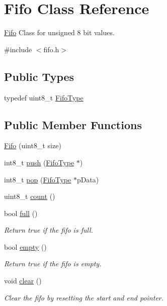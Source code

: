 \hypertarget{class_fifo}{
\section{Fifo Class Reference}
\label{class_fifo}
}


\hyperlink{class_fifo}{Fifo} Class for unsigned 8 bit values.  




{\ttfamily \#include $<$fifo.h$>$}

\subsection*{Public Types}
\begin{DoxyCompactItemize}
\item 
typedef uint8\_\-t \hyperlink{class_fifo_abc2a9e471beb538424db9e33955ec5f7}{FifoType}
\end{DoxyCompactItemize}
\subsection*{Public Member Functions}
\begin{DoxyCompactItemize}
\item 
\hyperlink{class_fifo_a68ef51a0abbde28576475176bea5ee77}{Fifo} (uint8\_\-t size)
\item 
int8\_\-t \hyperlink{class_fifo_a56e69165c03aa37aa174505386737430}{push} (\hyperlink{class_fifo_abc2a9e471beb538424db9e33955ec5f7}{FifoType} $\ast$)
\item 
int8\_\-t \hyperlink{class_fifo_aa5aa61cf236c38b141bd1bbeaf1addbd}{pop} (\hyperlink{class_fifo_abc2a9e471beb538424db9e33955ec5f7}{FifoType} $\ast$pData)
\item 
uint8\_\-t \hyperlink{class_fifo_a0a741f582688e9f956fd9e8c4cd1da37}{count} ()
\item 
bool \hyperlink{class_fifo_a2b09a5751fc2a301a341245e98f1e44a}{full} ()
\begin{DoxyCompactList}\small\item\em Return true if the fifo is full. \item\end{DoxyCompactList}\item 
bool \hyperlink{class_fifo_af0223af74146f1e800aa0a7b44a2cfda}{empty} ()
\begin{DoxyCompactList}\small\item\em Return true if the fifo is empty. \item\end{DoxyCompactList}\item 
void \hyperlink{class_fifo_a61aa8164d2e6fbdb2718835755495c95}{clear} ()
\begin{DoxyCompactList}\small\item\em Clear the fifo by resetting the start and end pointer. \item\end{DoxyCompactList}\end{DoxyCompactItemize}
